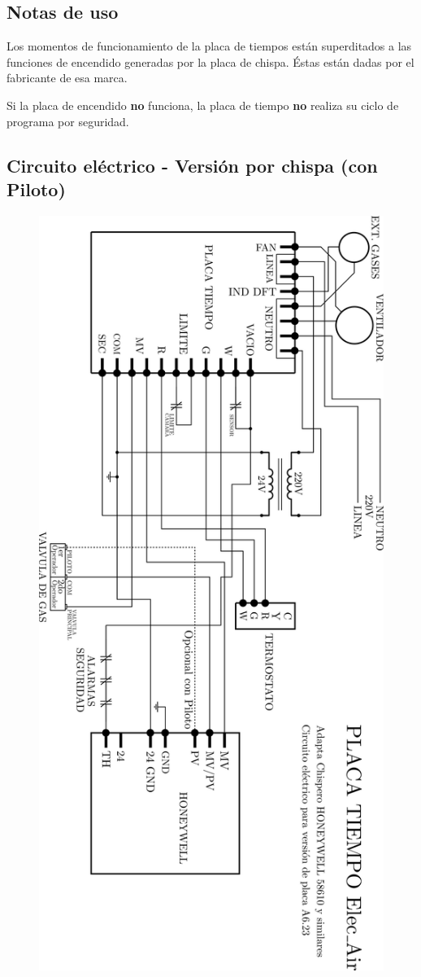\documentclass{article}
\begin{document}
\subsection*{Notas de uso}
Los momentos de funcionamiento de la placa de tiempos están superditados a las funciones de encendido generadas por la placa de chispa. Éstas están dadas por el fabricante de esa marca.\par Si la placa de encendido \textbf{no} funciona, la placa de tiempo \textbf{no} realiza su ciclo de programa por seguridad.

\newpage

\subsection*{Circuito eléctrico - Versión por chispa (con Piloto)}

\begin{figure}[H]
\centering
\includegraphics[width=0.65\linewidth]{images/PlacaTiempo_PlanoV623ConPiloto.png}
\end{figure}
\end{document}
